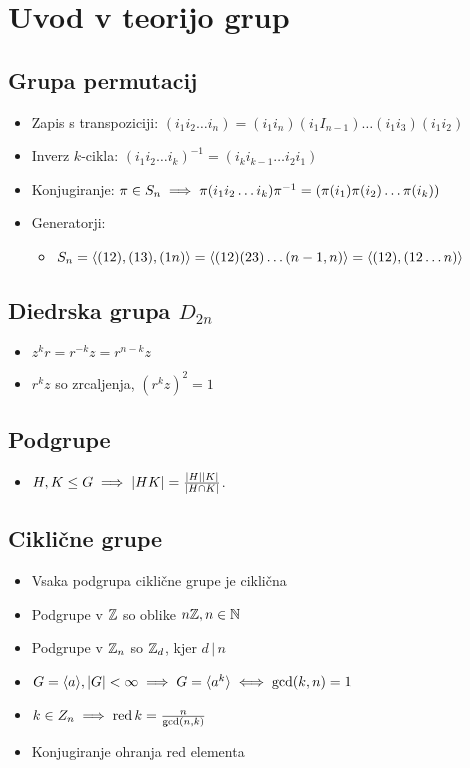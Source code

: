 \section{Uvod v teorijo grup}
\subsection{Grupa permutacij}
\begin{itemize}
    \item Zapis s transpoziciji: \((i_1 i_2 \ldots i_n) = (i_1 i_n)(i_1 I_{n-1}) \ldots (i_1 i_3)(i_1 i_2)\)
    \item Inverz \(k\)-cikla: \((i_1 i_2 \ldots i_k)^{-1}  = (i_k i_{k-1} \ldots i_2 i_1)\)
    \item Konjugiranje: \(\pi \in S_n \implies \pi (i_1 i_2 \ldots i_k) \pi^{-1} = (\pi(i_1) \pi(i_2) \ldots \pi(i_k))\)
    \item Generatorji:
    \begin{itemize}
        \item \(S_n = \langle {(1 2), (1 3), (1n)} \rangle = \langle {(12)(23)\ldots(n-1,n)} \rangle= \langle {(12), (12\ldots n)} \rangle\)
    \end{itemize}
\end{itemize}

\subsection{Diedrska grupa \(D_{2n}\)}
\begin{itemize}
    \item \(z^kr = r^{-k}z = r^{n - k}z\)
    \item \(r^kz\) so zrcaljenja, \((r^kz)^2 = 1\)
\end{itemize}

\subsection{Podgrupe}
\begin{itemize}
    \item \(H, K \leq G \implies |HK| = \frac{|H||K|}{|H \cap K|}\).
\end{itemize}

\subsection{Ciklične grupe}
\begin{itemize}
    \item Vsaka podgrupa ciklične grupe je ciklična
    \item Podgrupe v \(\mathbb{Z}\) so oblike \(n\mathbb{Z}, n \in \mathbb{N}\)
    \item Podgrupe v \(\mathbb{Z}_n\) so \(\mathbb{Z}_d\), kjer \(d\, |\, n\)
    \item \(G = \langle {a} \rangle, |G| < \infty \implies G = \langle {a^k} \rangle \iff \gcd (k, n) = 1\)
    \item \(k \in Z_n \implies \operatorname{red} k = \frac{n}{\gcd(n, k)}\)
    \item Konjugiranje ohranja red elementa
\end{itemize}

